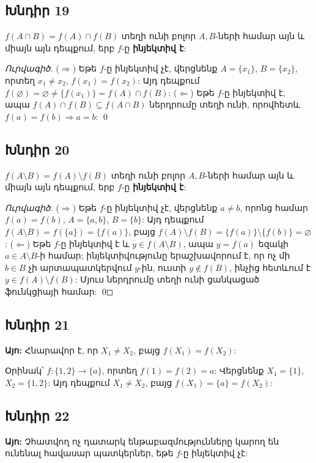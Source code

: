 \subsection*{Խնդիր 19}
$f(A\cap B)=f(A)\cap f(B)$ տեղի ունի բոլոր $A,B$-ների համար այն և միայն այն դեպքում, երբ $f$-ը \textbf{ինյեկտիվ է}:

\emph{Ուրվագիծ.} ($\Rightarrow$) Եթե $f$-ը ինյեկտիվ չէ, վերցնենք $A=\{x_1\}$, $B=\{x_2\}$, որտեղ $x_1\neq x_2$, $f(x_1)=f(x_2)$: Այդ դեպքում $f(\varnothing)=\varnothing\neq\{f(x_1)\}=f(A)\cap f(B)$: ($\Leftarrow$) Եթե $f$-ը ինյեկտիվ է, ապա $f(A)\cap f(B)\subseteq f(A\cap B)$ ներդրումը տեղի ունի, որովհետև $f(a)=f(b)\Rightarrow a=b$: \qed

\subsection*{Խնդիր 20}
$f(A\setminus B)=f(A)\setminus f(B)$ տեղի ունի բոլոր $A,B$-ների համար այն և միայն այն դեպքում, երբ $f$-ը \textbf{ինյեկտիվ է}:

\emph{Ուրվագիծ.} ($\Rightarrow$) Եթե $f$-ը ինյեկտիվ չէ, վերցնենք $a\neq b$, որոնց համար $f(a)=f(b)$, $A=\{a,b\}$, $B=\{b\}$: Այդ դեպքում $f(A\setminus B)=f(\{a\})=\{f(a)\}$, բայց $f(A)\setminus f(B)=\{f(a)\}\setminus\{f(b)\}=\varnothing$: ($\Leftarrow$) Եթե $f$-ը ինյեկտիվ է և $y\in f(A\setminus B)$, ապա $y=f(a)$ եզակի $a\in A\setminus B$-ի համար; ինյեկտիվությունը երաշխավորում է, որ ոչ մի $b\in B$ չի արտապատկերվում $y$-ին, ուստի $y\notin f(B)$, ինչից հետևում է $y\in f(A)\setminus f(B)$: Մյուս ներդրումը տեղի ունի ցանկացած ֆունկցիայի համար: \qed

\subsection*{Խնդիր 21}
\textbf{Այո:} Հնարավոր է, որ $X_1\neq X_2$, բայց $f(X_1)=f(X_2)$:

Օրինակ՝ $f:\{1,2\}\to\{a\}$, որտեղ $f(1)=f(2)=a$: Վերցնենք $X_1=\{1\}$, $X_2=\{1,2\}$: Այդ դեպքում $X_1\neq X_2$, բայց $f(X_1)=\{a\}=f(X_2)$:

\subsection*{Խնդիր 22}
\textbf{Այո:} Չհատվող ոչ դատարկ ենթաբազմությունները կարող են ունենալ հավասար պատկերներ, եթե $f$-ը ինյեկտիվ չէ:

